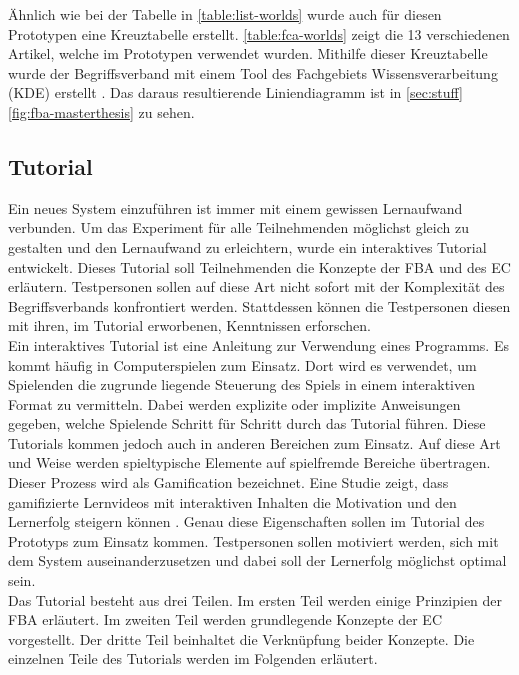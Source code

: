 Ähnlich wie bei der Tabelle in \autoref{table:list-worlds} wurde auch für diesen Prototypen eine Kreuztabelle erstellt.
\autoref{table:fca-worlds} zeigt die 13 verschiedenen Artikel, welche im Prototypen verwendet wurden.
Mithilfe dieser Kreuztabelle wurde der Begriffsverband mit einem Tool des Fachgebiets Wissensverarbeitung (KDE) erstellt \cite{conexp-clj}.
Das daraus resultierende Liniendiagramm ist in \autoref{sec:stuff} \autoref{fig:fba-masterthesis} zu sehen.

\subsection{Tutorial}
Ein neues System einzuführen ist immer mit einem gewissen Lernaufwand verbunden.
Um das Experiment für alle Teilnehmenden möglichst gleich zu gestalten und den Lernaufwand zu erleichtern, wurde ein interaktives Tutorial entwickelt.
Dieses Tutorial soll Teilnehmenden die Konzepte der \ac{FBA} und des \ac{EC} erläutern.
Testpersonen sollen auf diese Art nicht sofort mit der Komplexität des Begriffsverbands konfrontiert werden.
Stattdessen können die Testpersonen diesen mit ihren, im Tutorial erworbenen, Kenntnissen erforschen.\\

Ein interaktives Tutorial ist eine Anleitung zur Verwendung eines Programms.
Es kommt häufig in Computerspielen zum Einsatz.
Dort wird es verwendet, um Spielenden die zugrunde liegende Steuerung des Spiels in einem interaktiven Format zu vermitteln.
Dabei werden explizite oder implizite Anweisungen gegeben, welche Spielende Schritt für Schritt durch das Tutorial führen.
Diese Tutorials kommen jedoch auch in anderen Bereichen zum Einsatz.
Auf diese Art und Weise werden spieltypische Elemente auf spielfremde Bereiche übertragen. \\

Dieser Prozess wird als Gamification bezeichnet.
Eine Studie zeigt, dass gamifizierte Lernvideos mit interaktiven Inhalten die Motivation und den Lernerfolg steigern können \cite{gamification-videos}.
Genau diese Eigenschaften sollen im Tutorial des Prototyps zum Einsatz kommen.
Testpersonen sollen motiviert werden, sich mit dem System auseinanderzusetzen und dabei soll der Lernerfolg möglichst optimal sein.\\

Das Tutorial besteht aus drei Teilen.
Im ersten Teil werden einige Prinzipien der \ac{FBA} erläutert.
Im zweiten Teil werden grundlegende Konzepte der \ac{EC} vorgestellt.
Der dritte Teil beinhaltet die Verknüpfung beider Konzepte.
Die einzelnen Teile des Tutorials werden im Folgenden erläutert.\\

